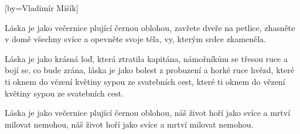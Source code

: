 [by={Vladimír Mišík}]

\beginverse{}
Láska je jako večernice plující černou oblohou,
zavřete dveře na petlice, zhasněte v domě všechny svíce
a opevněte svoje těla, vy, kterým srdce zkameněla.
\endverse{}

\beginverse*{}
            
\endverse{}

\beginverse{}
Láska je jako krásná loď, která ztratila kapitána,
námořníkům se třesou ruce a bojí se, co bude zrána,
láska je jako bolest z probuzení a horké ruce hvězd,
které ti oknem do vězení květiny sypou ze svatebních cest,
které ti oknem do vězení květiny sypou ze svatebních cest.
\endverse{}

\beginverse*{}
            
\endverse{}

\beginverse{}
Láska je jako večernice plující černou oblohou,
náš život hoří jako svíce a mrtví milovat nemohou,
náš život hoří jako svíce a mrtví milovat nemohou.
\endverse{}

\endsong{}
